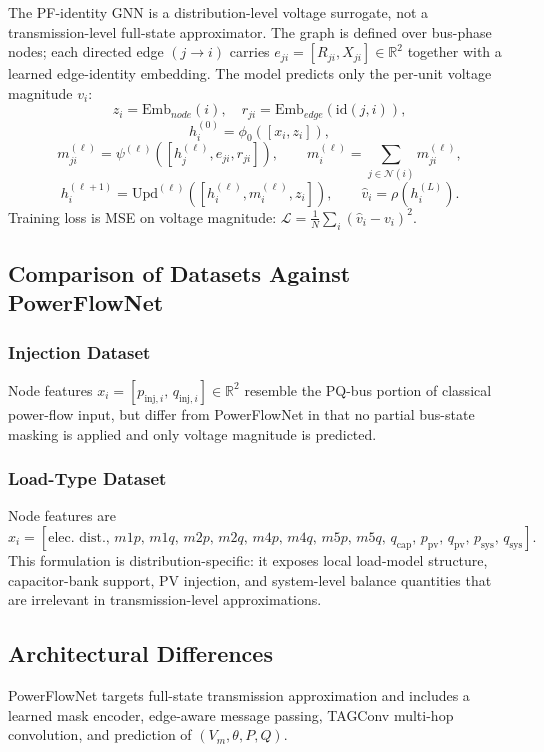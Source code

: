 \documentclass[11pt]{article}
\begin{document}
The PF-identity GNN is a distribution-level voltage surrogate, not a
transmission-level full-state approximator.  The graph is defined over
bus-phase nodes; each directed edge $(j\!\to\!i)$ carries
$e_{ji} = [R_{ji},X_{ji}]\in\mathbb{R}^2$
together with a learned edge-identity embedding.  The model predicts only
the per-unit voltage magnitude $v_i$:
\[
z_i = \mathrm{Emb}_{node}(i),\quad r_{ji} = \mathrm{Emb}_{edge}(\mathrm{id}(j,i)),
\]
\[
h_i^{(0)} = \phi_0([x_i,z_i]),
\]
\[
m_{ji}^{(\ell)} = \psi^{(\ell)}([h_j^{(\ell)},e_{ji},r_{ji}]),
\qquad
m_i^{(\ell)} = \textstyle\sum_{j\in\mathcal{N}(i)} m_{ji}^{(\ell)},
\]
\[
h_i^{(\ell+1)} = \mathrm{Upd}^{(\ell)}([h_i^{(\ell)},m_i^{(\ell)},z_i]),
\qquad
\hat v_i = \rho(h_i^{(L)}).
\]
Training loss is MSE on voltage magnitude:
$\mathcal{L} = \frac{1}{N}\sum_i(\hat v_i - v_i)^2$.

\subsection{Comparison of Datasets Against PowerFlowNet}

\subsubsection{Injection Dataset}

Node features $x_i = [p_{\text{inj},i},\,q_{\text{inj},i}]\in\mathbb{R}^2$
resemble the PQ-bus portion of classical power-flow input, but differ from
PowerFlowNet in that no partial bus-state masking is applied and only voltage
magnitude is predicted.

\subsubsection{Load-Type Dataset}

Node features are
\[
x_i =
[\text{elec.\ dist.},\,m1p,\,m1q,\,m2p,\,m2q,\,m4p,\,m4q,\,m5p,\,m5q,\,
 q_\text{cap},\,p_\text{pv},\,q_\text{pv},\,p_\text{sys},\,q_\text{sys}].
\]
This formulation is distribution-specific: it exposes local load-model
structure, capacitor-bank support, PV injection, and system-level balance
quantities that are irrelevant in transmission-level approximations.

\subsection{Architectural Differences}

PowerFlowNet targets full-state transmission approximation and includes a
learned mask encoder, edge-aware message passing, TAGConv multi-hop
convolution, and prediction of $(V_m,\theta,P,Q)$.
\end{document}
